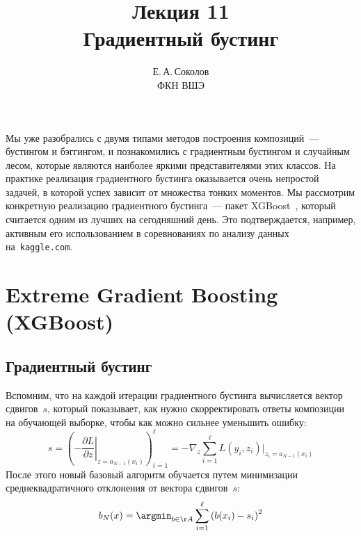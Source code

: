 \documentclass[12pt,fleqn]{article}
\begin{document}
\title{Лекция 11\\Градиентный бустинг}
\author{Е.\,А.\,Соколов\\ФКН ВШЭ}
\maketitle

Мы уже разобрались с двумя типами методов построения композиций~--- бустингом и бэггингом,
и познакомились с градиентным бустингом и случайным лесом, которые являются наиболее яркими
представителями этих классов.
На практике реализация градиентного бустинга оказывается очень непростой задачей,
в которой успех зависит от множества тонких моментов.
Мы рассмотрим конкретную реализацию градиентного бустинга~--- пакет XGBoost~\cite{chen16xgboost},
который считается одним из лучших на сегодняшний день.
Это подтверждается, например, активным его использованием в соревнованиях по анализу данных на~\texttt{kaggle.com}.

\section{Extreme Gradient Boosting (XGBoost)}
\subsection{Градиентный бустинг}
Вспомним, что на каждой итерации градиентного бустинга вычисляется вектор сдвигов~$s$,
который показывает, как нужно скорректировать ответы композиции на обучающей выборке,
чтобы как можно сильнее уменьшить ошибку:
\begin{equation}
\label{eq:gbm}
    s
    =
    \left(
        -\left.
        \frac{\partial L}{\partial z}
        \right|_{z = a_{N - 1}(x_i)}
    \right)_{i = 1}^{\ell}
    =
    -\nabla_z
    \sum_{i = 1}^{\ell}
        L(y_i, z_i)
    \Big|_{z_i = a_{N - 1}(x_i)}
\end{equation}
После этого новый базовый алгоритм обучается путем минимизации среднеквадратичного отклонения
от вектора сдвигов~$s$:
\[
    b_N(x)
    =
    \argmin_{b \in \AA}
        \sum_{i = 1}^{\ell}
            \left(
                b(x_i) - s_i
            \right)^2
\]
\end{document}
